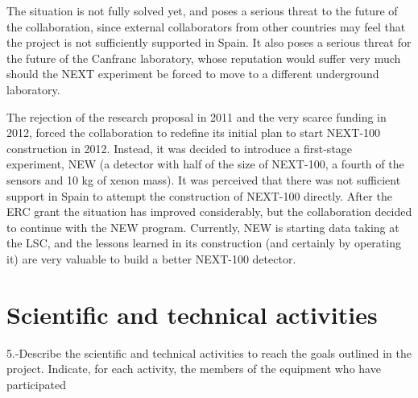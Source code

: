 \documentclass[a4paper,11pt,oneside]{article}
\begin{document}
The situation is not fully solved yet, and poses a serious threat to the future of the collaboration, since external collaborators from other countries may feel that the project is not sufficiently supported in Spain. It also poses a serious threat for the future of the Canfranc laboratory, whose reputation would suffer very much should the NEXT experiment be forced to move to a different underground laboratory. 

The rejection of the research proposal in 2011 and the very scarce funding in 2012, forced the collaboration to redefine its initial plan to start NEXT-100 construction in 2012. Instead, it was decided to introduce a first-stage experiment, NEW (a detector with half of the size of NEXT-100, a fourth of the sensors and 10 kg of xenon mass). It was perceived that there was not sufficient support in Spain to attempt the construction of NEXT-100 directly. After the ERC grant the situation has improved considerably, but the collaboration decided to continue with the NEW program. Currently, NEW is starting data taking at the LSC, and the lessons learned in its construction (and certainly by operating it) are very valuable to build a better NEXT-100 detector. 


\section{\bf \textsf{ Scientific and technical activities }} 

5.-Describe the scientific and technical activities to reach the goals outlined in the project. Indicate, for each activity, the members of the equipment who have participated
\end{document}
